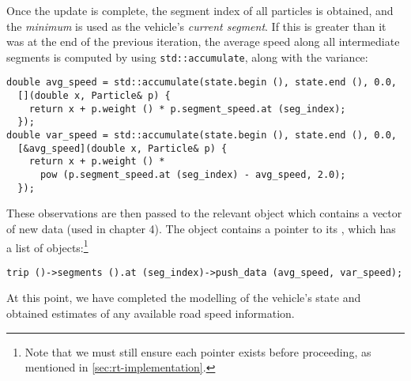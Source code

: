 Once the update is complete, the segment index of all particles is obtained, and the \emph{minimum} is used as the vehicle's \emph{current segment}. If this is greater than it was at the end of the previous iteration, the average speed along all intermediate segments is computed by using \verb+std::accumulate+, along with the variance:
\begin{lstlisting}
double avg_speed = std::accumulate(state.begin (), state.end (), 0.0,
  [](double x, Particle& p) {
    return x + p.weight () * p.segment_speed.at (seg_index);
  });
double var_speed = std::accumulate(state.begin (), state.end (), 0.0,
  [&avg_speed](double x, Particle& p) {
    return x + p.weight () *
      pow (p.segment_speed.at (seg_index) - avg_speed, 2.0);
  });
\end{lstlisting}
These observations are then passed to the relevant  object which contains a vector of new data (used in chapter 4). The  object contains a pointer to its , which has a list of  objects:\footnote{Note that we must still ensure each pointer exists before proceeding, as mentioned in \cref{sec:rt-implementation}.}
\begin{lstlisting}
trip ()->segments ().at (seg_index)->push_data (avg_speed, var_speed);
\end{lstlisting}

At this point, we have completed the modelling of the vehicle's state and obtained estimates of any available road speed information.
